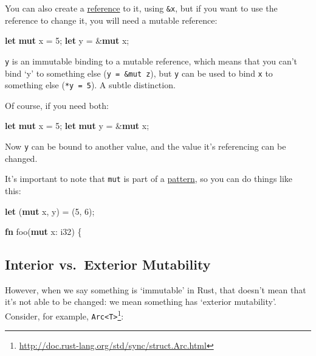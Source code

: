 \documentclass[a4paper,]{book}
\newenvironment{Shaded}{\begin{snugshade}}{\end{snugshade}}
\newcommand{\KeywordTok}[1]{\textcolor[rgb]{0.13,0.29,0.53}{\textbf{{#1}}}}
\newcommand{\DataTypeTok}[1]{\textcolor[rgb]{0.13,0.29,0.53}{{#1}}}
\newcommand{\DecValTok}[1]{\textcolor[rgb]{0.00,0.00,0.81}{{#1}}}
\newcommand{\NormalTok}[1]{{#1}}
\renewcommand{\href}[2]{#2\footnote{\url{#1}}}
\begin{document}
You can also create a
\protect\hyperlink{sec--references-and-borrowing}{reference} to it,
using \texttt{\&x}, but if you want to use the reference to change it,
you will need a mutable reference:

\begin{Shaded}
\begin{Highlighting}[]
\KeywordTok{let} \KeywordTok{mut} \NormalTok{x = }\DecValTok{5}\NormalTok{;}
\KeywordTok{let} \NormalTok{y = &}\KeywordTok{mut} \NormalTok{x;}
\end{Highlighting}
\end{Shaded}

\texttt{y} is an immutable binding to a mutable reference, which means
that you can't bind `y' to something else (\texttt{y\ =\ \&mut\ z}), but
\texttt{y} can be used to bind \texttt{x} to something else
(\texttt{*y\ =\ 5}). A subtle distinction.

Of course, if you need both:

\begin{Shaded}
\begin{Highlighting}[]
\KeywordTok{let} \KeywordTok{mut} \NormalTok{x = }\DecValTok{5}\NormalTok{;}
\KeywordTok{let} \KeywordTok{mut} \NormalTok{y = &}\KeywordTok{mut} \NormalTok{x;}
\end{Highlighting}
\end{Shaded}

Now \texttt{y} can be bound to another value, and the value it's
referencing can be changed.

It's important to note that \texttt{mut} is part of a
\protect\hyperlink{sec--patterns}{pattern}, so you can do things like
this:

\begin{Shaded}
\begin{Highlighting}[]
\KeywordTok{let} \NormalTok{(}\KeywordTok{mut} \NormalTok{x, y) = (}\DecValTok{5}\NormalTok{, }\DecValTok{6}\NormalTok{);}

\KeywordTok{fn} \NormalTok{foo(}\KeywordTok{mut} \NormalTok{x: }\DataTypeTok{i32}\NormalTok{) \{}
\end{Highlighting}
\end{Shaded}

\subsection{Interior vs.~Exterior
Mutability}\label{interior-vs.exterior-mutability}

However, when we say something is `immutable' in Rust, that doesn't mean
that it's not able to be changed: we mean something has `exterior
mutability'. Consider, for example,
\href{http://doc.rust-lang.org/std/sync/struct.Arc.html}{\texttt{Arc\textless{}T\textgreater{}}}:
\end{document}
